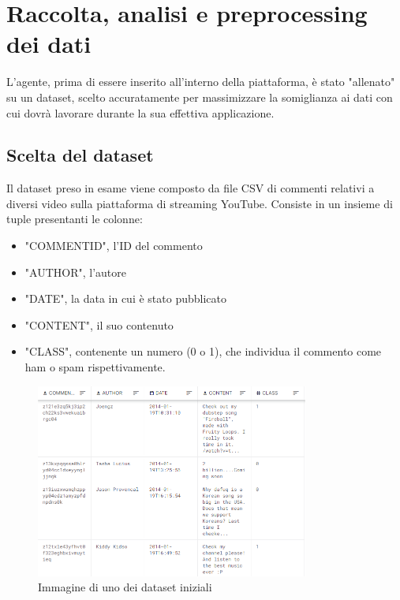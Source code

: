 \documentclass{report}
\begin{document}
    

  


   
    \chapter{Raccolta, analisi e preprocessing dei dati}
    L'agente, prima di essere inserito all'interno della piattaforma, è stato "allenato" su un dataset, scelto accuratamente per massimizzare la somiglianza ai dati con cui dovrà lavorare 
    durante la sua effettiva applicazione. 
    \section{Scelta del dataset}
    Il dataset preso in esame viene composto da file CSV di commenti relativi a diversi video sulla piattaforma di streaming YouTube. 
    Consiste in un insieme di tuple presentanti le colonne:
    \begin{itemize}

        \item "COMMENT\textunderscore ID", l'ID del commento

        \item "AUTHOR", l'autore
        \item "DATE", la data in cui è stato pubblicato
        \item "CONTENT", il suo contenuto
        \item "CLASS", contenente un numero (0 o 1), che individua il commento come ham o spam rispettivamente.
    \end{itemize}

    
    \begin{figure}[h]

        \centering
        \includegraphics[width = 0.8\textwidth]{immagini/datasetExample.png}
        \caption{Immagine di uno dei dataset iniziali}

    \end{figure}
\end{document}
